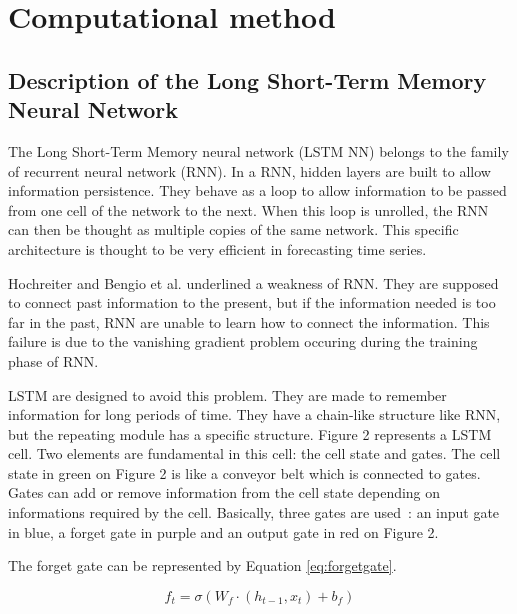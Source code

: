 \section{Computational method}


\subsection{Description of the Long Short-Term Memory Neural Network}

The Long Short-Term Memory neural network (LSTM NN) belongs to the family of recurrent neural network (RNN). 
In a RNN, hidden layers are built to allow information persistence. They behave as a loop to allow information 
to be passed from one cell of the network to the next. When this loop is unrolled, the RNN can then be thought 
as multiple copies of the same network. This specific architecture is thought to be very efficient in 
forecasting time series. 

Hochreiter \citet{hochreiter1991untersuchungen} and Bengio et al. \citet{bengio1994learning} underlined a weakness of RNN. 
They are supposed to connect past information to the present, but if the information needed is too far in the past, 
RNN are unable to learn how to connect the information. This failure is due to the vanishing gradient problem 
occuring during the training phase of RNN. 

LSTM are designed to avoid this problem. They are made to remember information for long periods of time. 
They have a chain-like structure like RNN, but the repeating module has a specific structure. 
Figure 2 represents a LSTM cell. Two elements are fundamental in this cell: the cell state and gates. 
The cell state in green on Figure 2 is like a conveyor belt which is connected to gates. 
Gates can add or remove information from the cell state depending on informations required by the cell. 
Basically, three gates are used : an input gate in blue, a forget gate in purple and an output gate in red 
on Figure 2. 


The forget gate can be represented by Equation \ref{eq:forgetgate}. 



\begin{equation}\label{eq:forgetgate}
 f_{t} = \sigma  \left( W_f \cdot  \left( h_{t-1}, x_t \right) + b_f \right)
\end{equation}

\vspace{\baselineskip}

